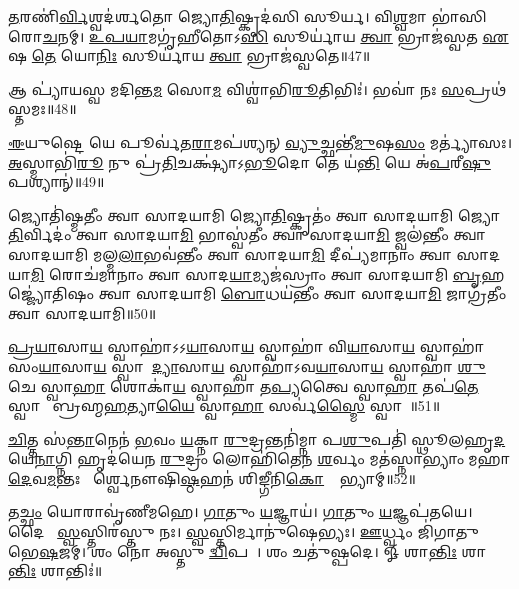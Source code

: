 \ul{𑌤}𑌰𑌣𑌿॑\ul{𑌰𑍍𑌵𑌿}𑌶𑍍𑌵𑌦॑𑌰𑍍\mbox{}𑌶𑌤𑍋 𑌜𑍍𑌯𑍋\ul{𑌤𑌿}𑌷𑍍𑌕𑍃𑌦॑𑌸𑌿 𑌸𑍂𑌰𑍍𑌯। 
𑌵𑌿\ul{𑌶𑍍𑌵}𑌮𑌾 𑌭𑌾॑𑌸𑌿 𑌰𑍋\ul{𑌚}𑌨𑌮𑍍। 
\ul{𑌉}\ul{𑌪}\ul{𑌯𑌾}𑌮𑌗𑍃॑𑌹𑍀𑌤𑍋𑌽\ul{𑌸𑌿} 𑌸𑍂𑌰𑍍𑌯𑌾॑𑌯 \ul{𑌤𑍍𑌵𑌾} 𑌭𑍍𑌰𑌾𑌜॑𑌸𑍍𑌵𑌤 \ul{𑌏}𑌷 \ul{𑌤𑍇} 𑌯𑍋\ul{𑌨𑌿𑌃} 𑌸𑍂𑌰𑍍𑌯𑌾॑𑌯 \ul{𑌤𑍍𑌵𑌾} 𑌭𑍍𑌰𑌾𑌜॑𑌸𑍍𑌵𑌤𑍇॥47॥
\anuvakamend

𑌆 𑌪𑍍𑌯𑌾॑𑌯𑌸𑍍𑌵 𑌮𑌦𑌿𑌨𑍍𑌤\ul{𑌮} 𑌸𑍋\ul{𑌮} 𑌵𑌿𑌶𑍍𑌵𑌾॑𑌭𑌿\ul{𑌰𑍂}𑌤𑌿𑌭𑌿𑌃॑। 
𑌭𑌵𑌾॑ 𑌨𑌃 \ul{𑌸}𑌪𑍍𑌰𑌥॑𑌸𑍍𑌤𑌮𑌃॥48॥
\anuvakamend

\ul{𑌈}𑌯𑍁𑌷𑍍𑌟𑍇 𑌯𑍇 𑌪𑍂𑌰𑍍𑌵॑𑌤\ul{𑌰𑌾}𑌮𑌪॑𑌶𑍍𑌯𑌨𑍍 \ul{𑌵𑍍𑌯𑍁}𑌚𑍍𑌛𑌨𑍍𑌤𑍀॑\ul{𑌮𑍁}𑌷\ul{𑌸𑌂} 𑌮𑌰𑍍𑌤𑍍𑌯𑌾॑𑌸𑌃। 
\ul{𑌅}𑌸𑍍𑌮𑌾𑌭𑌿॑\ul{𑌰𑍂} 𑌨𑍁 𑌪𑍍𑌰॑\ul{𑌤𑌿}𑌚𑌕𑍍𑌷𑍍𑌯𑌾॑𑌽\ul{𑌭𑍂}𑌦𑍋 𑌤𑍇 𑌯॑\ul{𑌨𑍍𑌤𑌿} 𑌯𑍇 𑌅॑\ul{𑌪}𑌰𑍀\ul{𑌷𑍁} 𑌪𑌶𑍍𑌯𑌾𑌨𑍍॑॥49॥
\anuvakamend

𑌜𑍍𑌯𑍋𑌤𑌿॑𑌷𑍍𑌮𑌤𑍀𑌂 𑌤𑍍𑌵𑌾 𑌸𑌾𑌦𑌯𑌾𑌮𑌿 𑌜𑍍𑌯𑍋\ul{𑌤𑌿}𑌷𑍍𑌕𑍃𑌤𑌂॑ 𑌤𑍍𑌵𑌾 𑌸𑌾𑌦𑌯𑌾𑌮𑌿 𑌜𑍍𑌯𑍋\ul{𑌤𑌿}𑌰𑍍𑌵𑌿𑌦𑌂॑ 𑌤𑍍𑌵𑌾 𑌸𑌾𑌦𑌯𑌾\ul{𑌮𑌿} 𑌭𑌾𑌸𑍍𑌵॑𑌤𑍀𑌂 𑌤𑍍𑌵𑌾 𑌸𑌾𑌦𑌯𑌾\ul{𑌮𑌿} 𑌜𑍍𑌵𑌲॑𑌨𑍍𑌤𑍀𑌂 𑌤𑍍𑌵𑌾 𑌸𑌾𑌦𑌯𑌾𑌮𑌿 𑌮𑌲𑍍𑌮\ul{𑌲𑌾}𑌭𑌵॑𑌨𑍍𑌤𑍀𑌂 𑌤𑍍𑌵𑌾 𑌸𑌾𑌦𑌯𑌾\ul{𑌮𑌿} 𑌦𑍀𑌪𑍍𑌯॑𑌮𑌾𑌨𑌾𑌂 𑌤𑍍𑌵𑌾 𑌸𑌾𑌦𑌯𑌾\ul{𑌮𑌿} 𑌰𑍋𑌚॑𑌮𑌾𑌨𑌾𑌂 𑌤𑍍𑌵𑌾 𑌸𑌾𑌦\ul{𑌯𑌾}𑌮𑍍𑌯𑌜॑𑌸𑍍𑌰𑌾𑌂 𑌤𑍍𑌵𑌾 𑌸𑌾𑌦𑌯𑌾𑌮𑌿 \ul{𑌬𑍃}𑌹𑌜𑍍𑌜𑍍𑌯𑍋॑𑌤𑌿𑌷𑌂 𑌤𑍍𑌵𑌾 𑌸𑌾𑌦𑌯𑌾𑌮𑌿 \ul{𑌬𑍋}𑌧𑌯॑𑌨𑍍𑌤𑍀𑌂 𑌤𑍍𑌵𑌾 𑌸𑌾𑌦𑌯𑌾\ul{𑌮𑌿} 𑌜𑌾𑌗𑍍𑌰॑𑌤𑍀𑌂 𑌤𑍍𑌵𑌾 𑌸𑌾𑌦𑌯𑌾𑌮𑌿॥50॥
\anuvakamend

\ul{𑌪𑍍𑌰}\ul{𑌯𑌾}𑌸𑌾\ul{𑌯} 𑌸𑍍𑌵𑌾𑌹𑌾॑𑌽𑌽\ul{𑌯𑌾}𑌸𑌾\ul{𑌯} 𑌸𑍍𑌵𑌾𑌹𑌾॑ 𑌵𑌿\ul{𑌯𑌾}𑌸𑌾\ul{𑌯} 𑌸𑍍𑌵𑌾𑌹𑌾॑ 𑌸𑌂\ul{𑌯𑌾}𑌸𑌾\ul{𑌯} 𑌸𑍍𑌵𑌾𑌹𑍋᳚\ul{𑌦𑍍𑌯𑌾}𑌸𑌾\ul{𑌯} 𑌸𑍍𑌵𑌾𑌹𑌾॑𑌽𑌵\ul{𑌯𑌾}𑌸𑌾\ul{𑌯} 𑌸𑍍𑌵𑌾𑌹𑌾॑ \ul{𑌶𑍁}𑌚𑍇 𑌸𑍍𑌵𑌾\ul{𑌹𑌾} 𑌶𑍋𑌕𑌾॑\ul{𑌯} 𑌸𑍍𑌵𑌾𑌹𑌾॑ 𑌤\ul{𑌪𑍍𑌯}𑌤𑍍𑌵𑍈 𑌸𑍍𑌵𑌾\ul{𑌹𑌾} 𑌤𑌪॑\ul{𑌤𑍇} 𑌸𑍍𑌵𑌾𑌹𑌾᳚ 𑌬𑍍𑌰𑌹𑍍𑌮\ul{𑌹}𑌤𑍍𑌯𑌾\ul{𑌯𑍈} 𑌸𑍍𑌵𑌾\ul{𑌹𑌾} 𑌸𑌰𑍍𑌵॑\ul{𑌸𑍍𑌮𑍈} 𑌸𑍍𑌵𑌾𑌹𑌾᳚॥51॥
\anuvakamend

\ul{𑌚𑌿}𑌤𑍍𑌤 𑌸॑\ul{𑌨𑍍𑌤𑌾}𑌨𑍇𑌨॑ \ul{𑌭}𑌵𑌂 \ul{𑌯}𑌕𑍍𑌨𑌾 \ul{𑌰𑍁}𑌦𑍍𑌰𑌨𑍍𑌤𑌨𑌿॑𑌮𑍍𑌨𑌾 𑌪\ul{𑌶𑍁}𑌪𑌤𑌿॑ 𑌸𑍍𑌥𑍂𑌲𑌹𑍃\ul{𑌦}𑌯𑍇\ul{𑌨𑌾}𑌗𑍍𑌨𑌿 𑌹𑍃𑌦॑𑌯𑍇𑌨 \ul{𑌰𑍁}𑌦𑍍𑌰𑌂 𑌲𑍋𑌹𑌿॑𑌤𑍇𑌨 \ul{𑌶}𑌰𑍍𑌵𑌂 𑌮𑌤॑𑌸𑍍𑌨𑌾𑌭𑍍𑌯𑌾𑌂 𑌮𑌹𑌾\ul{𑌦𑍇}𑌵\ul{𑌮}𑌨𑍍𑌤𑌃 𑌪𑌾᳚𑌰𑍍𑌶𑍍𑌵𑍇𑌨𑍗𑌷𑌿\ul{𑌷𑍍𑌠}𑌹𑌨॑ 𑌶𑌿𑌙𑍍𑌗𑍀𑌨𑌿\ul{𑌕𑍋}𑌶𑍍𑌯𑌾᳚𑌭𑍍𑌯𑌾𑌮𑍍॥52॥
\anuvakamend

𑌤\ul{𑌚𑍍𑌛𑌂} 𑌯𑍋𑌰𑌾𑌵𑍃॑𑌣𑍀𑌮𑌹𑍇। 
\ul{𑌗𑌾}𑌤𑍁𑌂 \ul{𑌯}𑌜𑍍𑌞𑌾𑌯॑। 
\ul{𑌗𑌾}𑌤𑍁𑌂 \ul{𑌯}𑌜𑍍𑌞𑌪॑𑌤𑌯𑍇। 
𑌦𑍈𑌵𑍀𑌃᳚ \ul{𑌸𑍍𑌵}𑌸𑍍𑌤𑌿𑌰॑𑌸𑍍𑌤𑍁 𑌨𑌃। 
\ul{𑌸𑍍𑌵}𑌸𑍍𑌤𑌿𑌰𑍍𑌮𑌾𑌨𑍁॑𑌷𑍇𑌭𑍍𑌯𑌃। 
\ul{𑌊}𑌰𑍍𑌧𑍍𑌵𑌂 𑌜𑌿॑𑌗𑌾𑌤𑍁 𑌭𑍇\ul{𑌷}𑌜𑌮𑍍। 
𑌶𑌂 𑌨𑍋॑ 𑌅𑌸𑍍𑌤𑍁 \ul{𑌦𑍍𑌵𑌿}𑌪𑌦𑍇᳚। 
𑌶𑌂 𑌚𑌤𑍁॑𑌷𑍍𑌪𑌦𑍇। 
𑍐 𑌶𑌾\ul{𑌨𑍍𑌤𑌿𑌃} 𑌶𑌾\ul{𑌨𑍍𑌤𑌿𑌃} 𑌶𑌾𑌨𑍍𑌤𑌿𑌃॑॥

\closesection
\clearpage
